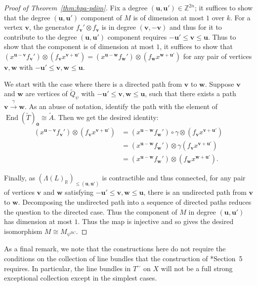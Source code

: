 \documentclass{amsart}
\newcommand{\ZZ}{\mathbb{Z}}
\newcommand{\RR}{\mathbb{R}}
\newcommand{\field}{k}
\DeclareMathOperator{\End}{End}
\theoremstyle{remark}
\begin{document}
\begin{proof}[Proof of Theorem~\ref{thm:hpa-pdim}]
  Fix a degree $(\bm{u},\bm{u}')\in \ZZ^{2n}$; it suffices to show that the degree $(\bm{u},\bm{u}')$ component of $M$ is of dimension at most $1$ over $\field$.
  For a vertex $\bm{v}$, the generator $f_{\bm{v}}'\otimes f_{\bm{v}}$ is in degree $(\bm{v},-\bm{v})$ and thus for it to contribute to the degree $(\bm{u},\bm{u}')$ component requires $-\bm{u}'\leq \bm{v}\leq \bm{u}$.
  Thus to show that the component is of dimension at most $1$, it suffices to show that
  $(x^{\bm{u}-\bm{v}}f_{\bm{v}}')\otimes (f_{\bm{v}} x^{\bm{v}+\bm{u}'})=(x^{\bm{u}-\bm{w}}f_{\bm{w}}')\otimes (f_{\bm{w}} x^{\bm{w}+\bm{u}'})$ for any pair of vertices $\bm{v},\bm{w}$ with $-\bm{u}'\leq \bm{v},\bm{w}\leq \bm{u}$.

  We start with the case where there is a directed path from $\bm{v}$ to $\bm{w}$. Suppose $\bm{v}$ and $\bm{w}$ are vertices of $\widetilde{Q}_\psi$ with $-\bm{u}'\leq \bm{v},\bm{w}\leq \bm{u}$, such that there exists a path $\bm{v}\xrightarrow{\gamma} \bm{w}$. As an abuse of notation, identify the path with the element of $\End(\widetilde{T})_{\bm{0}}\cong \widetilde{A}$. Then we get the desired identity:
  \begin{align*}
    (x^{\bm{u}-\bm{v}}f_{\bm{v}}')\otimes (f_{\bm{v}} x^{\bm{v}+\bm{u}'}) &= (x^{\bm{u}-\bm{w}}f_{\bm{w}}')\circ \gamma \otimes (f_{\bm{v}} x^{\bm{v}+\bm{u}'})\\
    &= (x^{\bm{u}-\bm{w}}f_{\bm{w}}')\otimes \gamma (f_{\bm{v}} x^{\bm{v}+\bm{u'}})\\
    &= (x^{\bm{u}-\bm{w}}f_{\bm{w}}')\otimes (f_{\bm{w}} x^{\bm{w}+\bm{u}'}).
  \end{align*}

  Finally, as $(\Lambda(L)_{\RR})_{\leq (\bm{u},\bm{u}')}$ is contractible and thus connected, for any pair of vertices $\bm{v}$ and $\bm{w}$ satisfying $-\bm{u}'\leq \bm{v},\bm{w}\leq \bm{u}$, there is an undirected path from $\bm{v}$ to $\bm{w}$. Decomposing the undirected path into a sequence of directed paths reduces the question to the directed case. Thus the component of $M$ in degree $(\bm{u},\bm{u}')$ has dimension at most $1$. Thus the map is injective and so gives the desired isomorphism $M\cong M_{\psi^{BC}}$.
\end{proof}

As a final remark, we note that the constructions here do not require the conditions on the collection of line bundles that the construction of \cite{FH25}*{Section~5} requires. In particular, the line bundles in $T^{\sim}$ on $X$ will not be a full strong exceptional collection except in the simplest cases.
\end{document}
